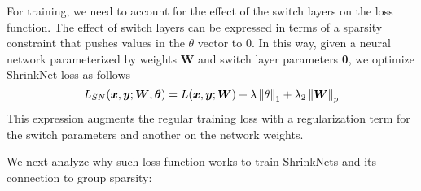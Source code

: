 For training, we need to account for the effect of the switch layers on the loss
function. The effect of switch layers can be expressed in terms of a sparsity constraint
that pushes values in the $\theta$ vector to 0. In this way, given a neural network
parameterized by weights $\bm{W}$ and switch layer parameters $\bm{\theta}$, we
optimize ShrinkNet loss as follows 
\begin{equation}
\small
  L_{SN}(\bm{x},\bm{y};\bm{W}, \bm{\theta}) = L(\bm{x}, \bm{y}; \bm{W}) +
  \lambda\norm{\theta}_1 + \lambda_2\norm{\bm{W}}_p
\end{equation}
This expression augments the regular training loss with a regularization
term for the switch parameters and another on the network weights.

We next analyze why such loss function works to train ShrinkNets and its
connection to group sparsity:






